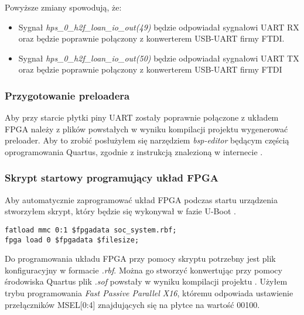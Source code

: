 Powyższe zmiany spowodują, że:
\begin{itemize}[noitemsep]
\item Sygnał \textit{hps\_0\_h2f\_loan\_io\_out(49)} będzie odpowiadał sygnałowi UART RX oraz będzie poprawnie połączony z konwerterem USB-UART firmy FTDI.
\item Sygnał \textit{hps\_0\_h2f\_loan\_io\_out(50)} będzie odpowiadał sygnałowi UART TX oraz będzie poprawnie połączony z konwerterem USB-UART firmy FTDI
\end{itemize}

\subsubsection{Przygotowanie preloadera}
\label{sec:uart-preloader-gen}
Aby przy starcie płytki piny UART zostały poprawnie połączone z układem FPGA należy z plików powstałych w wyniku kompilacji projektu wygenerować preloader. Aby to zrobić posłużyłem się narzędziem \textit{bsp-editor} będącym częścią oprogramowania Quartus, zgodnie z instrukcją znalezioną w internecie \cite{rocketboards-preloader}.

\subsubsection{Skrypt startowy programujący układ FPGA}
Aby automatycznie zaprogramować układ FPGA podczas startu urządzenia stworzyłem skrypt, który będzie się wykonywał w fazie U-Boot \cite{rocketboards-uboot-script}.
\begin{lstlisting}
fatload mmc 0:1 $fpgadata soc_system.rbf;
fpga load 0 $fpgadata $filesize;
\end{lstlisting}
Do programowania układu FPGA przy pomocy skryptu potrzebny jest plik konfiguracyjny w formacie \textit{.rbf}. Można go stworzyć konwertując przy pomocy środowiska Quartus plik \textit{.sof} powstały w wyniku kompilacji projektu \cite{rocketboards-sof-to-rfb}. Użyłem trybu programowania \textit{Fast Passive Parallel X16}, któremu odpowiada ustawienie przełączników MSEL[0:4] znajdujących się na płytce na wartość 00100.

